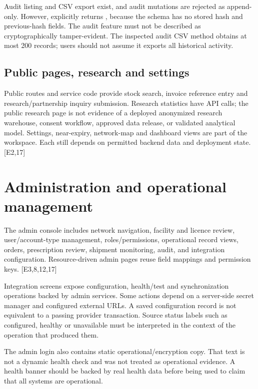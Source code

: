 \documentclass[11pt,a4paper]{article}
\newcommand{\source}[1]{{\small\path{#1}}}
\newcommand{\evidence}[1]{\textcolor{muted}{[E#1]}}
\begin{document}
Audit listing and CSV export exist, and audit mutations are rejected as append-only. However, \source{verifyChain()} explicitly returns \source{verifiable: false}, because the schema has no stored hash and previous-hash fields. The audit feature must not be described as cryptographically tamper-evident. The inspected audit CSV method obtains at most 200 records; users should not assume it exports all historical activity.

\subsection{Public pages, research and settings}
Public routes and service code provide stock search, invoice reference entry and research/partnership inquiry submission. Research statistics have API calls; the public research page is not evidence of a deployed anonymized research warehouse, consent workflow, approved data release, or validated analytical model. Settings, near-expiry, network-map and dashboard views are part of the workspace. Each still depends on permitted backend data and deployment state. \evidence{2,17}

\section{Administration and operational management}
The admin console includes network navigation, facility and licence review, user/account-type management, roles/permissions, operational record views, orders, prescription review, shipment monitoring, audit, and integration configuration. Resource-driven admin pages reuse field mappings and permission keys. \evidence{3,8,12,17}

Integration screens expose configuration, health/test and synchronization operations backed by admin services. Some actions depend on a server-side secret manager and configured external URLs. A saved configuration record is not equivalent to a passing provider transaction. Source status labels such as configured, healthy or unavailable must be interpreted in the context of the operation that produced them.

The admin login also contains static operational/encryption copy. That text is not a dynamic health check and was not treated as operational evidence. A health banner should be backed by real health data before being used to claim that all systems are operational.
\end{document}
